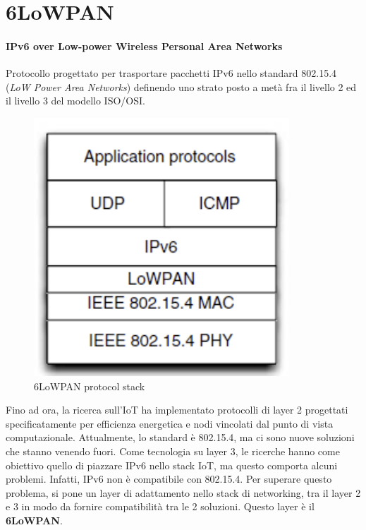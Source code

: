 \documentclass{article}
\begin{document}
\newpage
\section{6LoWPAN}
\paragraph{IPv6 over Low-power Wireless Personal Area Networks}
Protocollo progettato per trasportare pacchetti IPv6 nello standard 802.15.4 (\textit{LoW Power Area Networks}) definendo uno strato posto a metà fra il livello 2 ed il livello 3 del modello ISO/OSI.
\begin{figure}[H]
\centering
\includegraphics[scale=0.6]{figures/6LoWPAN stack.png}
\caption{6LoWPAN protocol stack}
\end{figure}
Fino ad ora, la ricerca sull'IoT ha implementato protocolli di layer 2 progettati specificatamente per efficienza energetica e nodi vincolati dal punto di vista computazionale. Attualmente, lo standard è 802.15.4, ma ci sono nuove soluzioni che stanno venendo fuori. Come tecnologia su layer 3, le ricerche hanno come obiettivo quello di piazzare IPv6 nello stack IoT, ma questo comporta alcuni problemi. Infatti, IPv6 non è compatibile con 802.15.4. Per superare questo problema, si pone un layer di adattamento nello stack di networking, tra il layer 2 e 3 in modo da fornire compatibilità tra le 2 soluzioni. Questo layer è il \textbf{6LoWPAN}.
\end{document}
